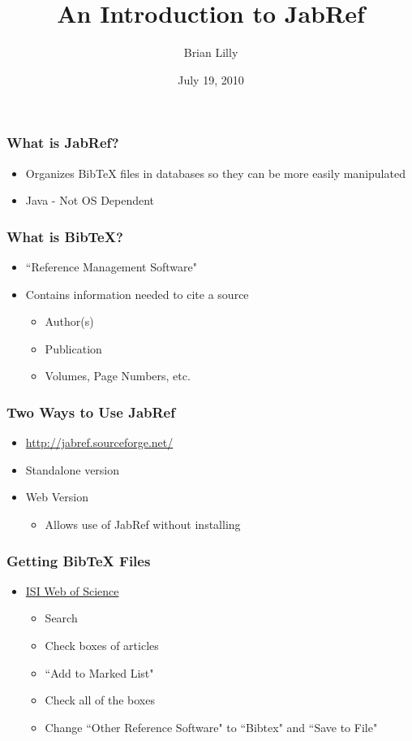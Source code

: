 \documentclass[10pt]{beamer}
\title{An Introduction to JabRef}
\author{Brian Lilly}
\date{July 19, 2010}
\begin{document}
\maketitle
\begin{frame}
\frametitle{What is JabRef?}
\begin{itemize}
\item Organizes BibTeX files in databases so they can be more easily manipulated
\item Java - Not OS Dependent
\end{itemize}
\end{frame}

\begin{frame}
\frametitle{What is BibTeX?}
\begin{itemize}
\item ``Reference Management Software"
\item Contains information needed to cite a source
	\begin{itemize}
	\item Author(s)
	\item Publication
	\item Volumes, Page Numbers, etc.
	\end{itemize}
\end{itemize}
\end{frame}

\begin{frame}
\frametitle{Two Ways to Use JabRef}
\begin{itemize}
\item \url{http://jabref.sourceforge.net/}
\item Standalone version
\item Web Version
	\begin{itemize}
	\item Allows use of JabRef without installing
	\end{itemize}
\end{itemize}
\end{frame}

\begin{frame}
\frametitle{Getting BibTeX Files}
\begin{itemize}
\item \href{http://apps.isiknowledge.com/WOS_GeneralSearch_input.do?product=WOS&search_mode=GeneralSearch&SID=4El@7A2mGNLCA3odgOE&preferencesSaved=&highlighted_tab=WOS}{ISI Web of Science}
	\begin{itemize}
	\item Search
	\item Check boxes of articles
	\item ``Add to Marked List"
	\item Check all of the boxes
	\item Change ``Other Reference Software" to ``Bibtex" and ``Save to File"
	\end{itemize}
\end{itemize}
\end{frame}
\end{document}
